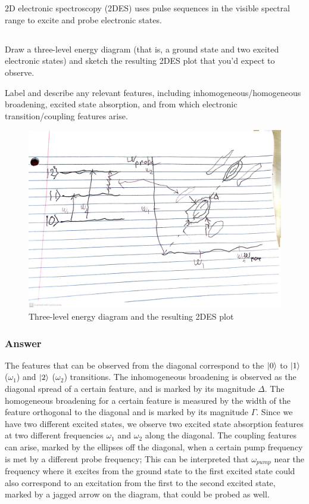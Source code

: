 \documentclass[12pt]{article}
\begin{document}
\section{}
$2 \mathrm{D}$ electronic spectroscopy (2DES) uses pulse sequences in the visible spectral range to excite and probe electronic states.
\subsection{}

Draw a three-level energy diagram (that is, a ground state and two excited electronic states) and sketch the resulting 2DES plot that you'd expect to observe.

Label and describe any relevant features, including inhomogeneous/homogeneous broadening, excited state absorption, and from which electronic transition/coupling features arise.
\begin{figure}
  \centering
  \includegraphics[max width=\textwidth]{CamScanner 05-28-2024 22.17.jpg}
  \caption{Three-level energy diagram and the resulting 2DES plot}
  \label{fig:my_label}
\end{figure}
\subsubsection{Answer}
The features that can be observed from the diagonal correspond to the $\ket{0}$ to $\ket{1}$ ($\omega _{1}$) and $\ket{2}$ ($\omega _{2}$) transitions. The inhomogeneous broadening is observed as the diagonal spread of a certain feature, and is marked by its magnitude $\Delta $. The homogeneous broadening for a certain feature is measured by the width of the feature orthogonal to the diagonal and is marked by its magnitude $\Gamma $. Since we have two different excited states, we observe two excited state absorption features at two different frequencies $\omega _{1}$ and $\omega _{2}$ along the diagonal. The coupling features can arise, marked by the ellipses off the diagonal, when a certain pump frequency is met by a different probe frequency; This can be interpreted that $\omega _{pump}$ near the frequency where it excites from the ground state to the first excited state could also correspond to an excitation from the first to the second excited state, marked by a jagged arrow on the diagram, that could be probed as well.
\end{document}
